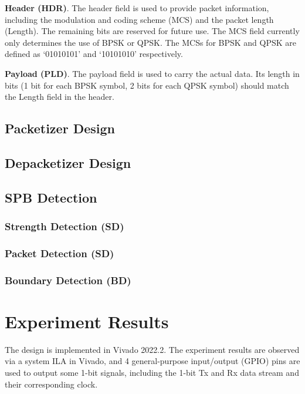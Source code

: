 \documentclass[journal,twoside]{IEEEtran}
\begin{document}
    \textbf{Header (HDR)}.
    The header field is used to provide packet information,
    including the modulation and coding scheme (MCS) and the packet length (Length).
    The remaining bits are reserved for future use.
    The MCS field currently only determines the use of BPSK or QPSK.
    The MCSs for BPSK and QPSK are defined as `01010101' and `10101010' respectively.

    \textbf{Payload (PLD)}.
    The payload field is used to carry the actual data.
    Its length in bits (1 bit for each BPSK symbol, 2 bits for each QPSK symbol) should match the Length field in the header.

    \subsection{Packetizer Design}

    \subsection{Depacketizer Design}

    \subsection{SPB Detection}

      \subsubsection{Strength Detection (SD)}

      \subsubsection{Packet Detection (SD)}

      \subsubsection{Boundary Detection (BD)}

  \section{Experiment Results}

    The design is implemented in Vivado 2022.2.
    The experiment results are observed via a system ILA in Vivado,
    and 4 general-purpose input/output (GPIO) pins are used to output some 1-bit signals,
    including the 1-bit Tx and Rx data stream and their corresponding clock.
\end{document}
